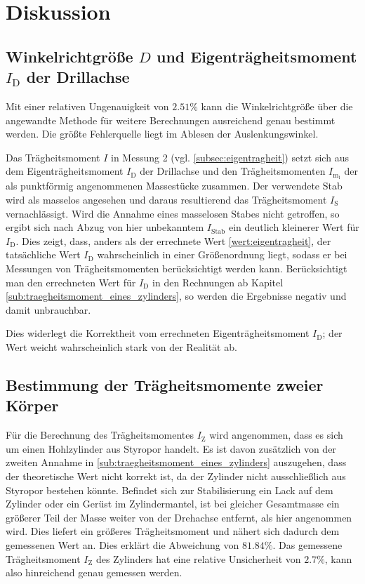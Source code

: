 \section{Diskussion} %
\label{sec:diskussion}

\subsection{Winkelrichtgröße $D$ und Eigenträgheitsmoment $I_\text{D}$ der Drillachse}
\label{Systembestimmend}
Mit einer relativen Ungenauigkeit von $2.51\%$ kann die Winkelrichtgröße über die angewandte Methode für weitere Berechnungen ausreichend genau bestimmt werden. 
Die größte Fehlerquelle liegt im Ablesen der Auslenkungswinkel.

Das Trägheitsmoment $I$ in Messung 2 (vgl. \ref{subsec:eigentragheit}) setzt sich aus dem Eigenträgheitsmoment $I_\text{D}$
der Drillachse und den Trägheitsmomenten $I_\mathup{m_i}$ der als punktförmig angenommenen Massestücke zusammen. 
Der verwendete Stab wird als masselos angesehen und daraus resultierend das Trägheitsmoment $I{_\text{S}}$ vernachlässigt. 
Wird die Annahme eines masselosen Stabes nicht getroffen, so ergibt sich nach Abzug von hier unbekanntem $I_{\text{Stab}}$ ein deutlich kleinerer Wert für $I_{\text{D}}$.
Dies zeigt, dass, anders als der errechnete Wert \eqref{wert:eigentragheit}, der tatsächliche Wert $I_{\text{D}}$ wahrscheinlich in einer Größenordnung liegt, sodass er bei Messungen von Trägheitsmomenten berücksichtigt werden kann. Berücksichtigt man den errechneten Wert für $I_{\text{D}}$ in den Rechnungen ab Kapitel \ref{sub:traegheitsmoment_eines_zylinders}, so werden die Ergebnisse negativ und damit unbrauchbar. 

Dies widerlegt die Korrektheit vom errechneten Eigenträgheitsmoment $I_{\text{D}}$; der Wert weicht wahrscheinlich stark von der Realität ab.

\subsection{Bestimmung der Trägheitsmomente zweier Körper}
Für die Berechnung des Trägheitsmomentes $I_{\text{Z}}$ wird angenommen, dass es sich um einen Hohlzylinder aus Styropor handelt. 
Es ist davon zusätzlich von der zweiten Annahme in \ref{sub:traegheitsmoment_eines_zylinders} auszugehen, dass der theoretische Wert nicht korrekt ist, da der Zylinder nicht ausschließlich aus Styropor bestehen könnte. 
Befindet sich zur Stabilisierung ein Lack auf dem Zylinder oder ein Gerüst im Zylindermantel, ist bei gleicher Gesamtmasse ein größerer Teil der Masse weiter von der Drehachse entfernt, als hier angenommen wird. Dies liefert ein größeres Trägheitsmoment und nähert sich dadurch dem gemessenen Wert an. Dies erklärt die Abweichung von $81.84\%$.
Das gemessene Trägheitsmoment $I{_\text{Z}}$ des Zylinders hat eine relative Unsicherheit von $2.7\%$, kann also hinreichend genau gemessen werden.

